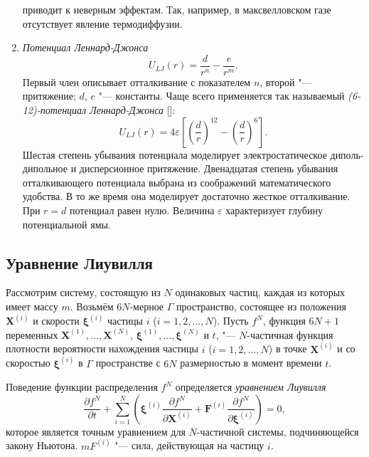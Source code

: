 \begin{enumerate}
приводит к неверным эффектам. Так, например, в максвелловском газе отсутствует явление термодиффузии.
	\item \textit{Потенциал Леннард-Джонса} \[ U_{LJ}(r) = \frac{d}{r^n} - \frac{e}{r^m} .\]
Первый член описывает отталкивание с показателем \(n\), второй "--- притяжение; \(d\), \(e\) "--- константы.
Чаще всего применяется так называемый \textit{(6-12)-потенциал Леннард-Джонса} []:
\[ U_{LJ}(r) = 4\varepsilon\left[\left(\frac{d}{r}\right)^{12} - \left(\frac{d}{r}\right)^6\right] .\]
Шестая степень убывания потенциала моделирует электростатическое диполь-дипольное и дисперсионное притяжение.
Двенадцатая степень убывания отталкивающего потенциала выбрана из соображений математического удобства.
В то же время она моделирует достаточно жесткое отталкивание.
При \(r=d\) потенциал равен нулю. Величина \(\varepsilon\) характеризует глубину потенциальной ямы.
\end{enumerate}

\subsection{Уравнение Лиувилля}

Рассмотрим систему, состоящую из \(N\) одинаковых частиц, каждая из которых имеет массу \(m\).
Возьмём \(6N\)-мерное \(\Gamma\) пространство, состоящее из положения \(\boldsymbol{X}^{(i)}\)
и скорости \(\boldsymbol\xi^{(i)}\) частицы \(i\) (\(i=1,2,\dots, N\)).
Пусть \(f^N\), функция \(6N + 1\) переменных \(\boldsymbol{X}^{(1)},\dots,\boldsymbol{X}^{(N)}\),
\(\boldsymbol{\xi}^{(1)},\dots,\boldsymbol{\xi}^{(N)}\) и \(t\), "---
\(N\)-частичная функция плотности вероятности нахождения частицы \(i\) (\(i=1,2,\dots, N\))
в точке \(\boldsymbol{X}^{(i)}\) и со скоростью \(\boldsymbol\xi^{(i)}\) в \(\Gamma\) пространстве 
с \(6N\) размерностью в момент времени \(t\).

Поведение функции распределения \(f^N\) определяется \textit{уравнением Лиувилля}
\begin{equation}\label{eq:Liouville}
	\frac{\partial f^N}{\partial t} + \sum_{i=1}^{N}\left(
		\boldsymbol\xi^{(i)}\frac{\partial f^N}{\partial \boldsymbol{X}^{(i)}} + 
		\boldsymbol{F}^{(i)}\frac{\partial f^N}{\partial \boldsymbol{\xi}^{(i)}}\right) = 0,
\end{equation}
которое является точным уравнением для \(N\)-частичной системы, подчиняющейся закону Ньютона.
\(mF^{(i)}\) "--- сила, действующая на частицу \(i\).

